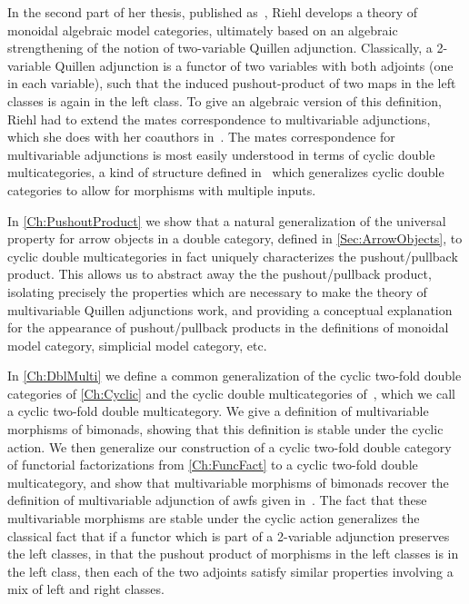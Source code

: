 In the second part of her thesis, published as~\cite{riehl:nwfs-monoidal}, Riehl develops a theory of monoidal algebraic model categories, ultimately based on an algebraic strengthening of the notion of two-variable Quillen adjunction. Classically, a 2-variable Quillen adjunction is a functor of two variables with both adjoints (one in each variable), such that the induced pushout-product of two maps in the left classes is again in the left class. To give an algebraic version of this definition, Riehl had to extend the mates correspondence to multivariable adjunctions, which she does with her coauthors in~\cite{cgr:mates}. The mates correspondence for multivariable adjunctions is most easily understood in terms of cyclic double multicategories, a kind of structure defined in~\cite{cgr:mates} which generalizes cyclic double categories to allow for morphisms with multiple inputs.

In \cref{Ch:PushoutProduct} we show that a natural generalization of the universal property for arrow objects in a double category, defined in \cref{Sec:ArrowObjects}, to cyclic double multicategories in fact uniquely characterizes the pushout/pullback product. This allows us to abstract away the the pushout/pullback product, isolating precisely the properties which are necessary to make the theory of multivariable Quillen adjunctions work, and providing a conceptual explanation for the appearance of pushout/pullback products in the definitions of monoidal model category, simplicial model category, etc.

In \cref{Ch:DblMulti} we define a common generalization of the cyclic two-fold double categories of \cref{Ch:Cyclic} and the cyclic double multicategories of~\cite{cgr:mates}, which we call a cyclic two-fold double multicategory. We give a definition of multivariable morphisms of bimonads, showing that this definition is stable under the cyclic action. We then generalize our construction of a cyclic two-fold double category of functorial factorizations from \cref{Ch:FuncFact} to a cyclic two-fold double multicategory, and show that multivariable morphisms of bimonads recover the definition of multivariable adjunction of awfs given in~\cite{riehl:nwfs-monoidal}. The fact that these multivariable morphisms are stable under the cyclic action generalizes the classical fact that if a functor which is part of a 2-variable adjunction preserves the left classes, in that the pushout product of morphisms in the left classes is in the left class, then each of the two adjoints satisfy similar properties involving a mix of left and right classes.